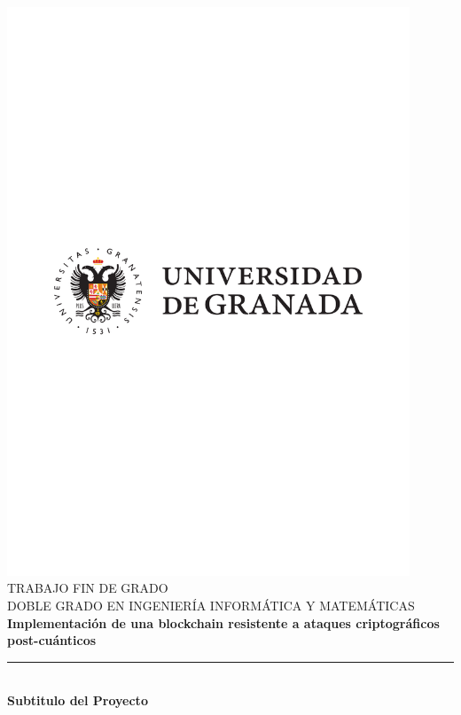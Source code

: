 \begin{titlepage}
 
 
\newlength{\centeroffset}
\setlength{\centeroffset}{-0.5\oddsidemargin}
\addtolength{\centeroffset}{0.5\evensidemargin}
\thispagestyle{empty}

\noindent\hspace*{\centeroffset}\begin{minipage}{\textwidth}

\centering
\includegraphics[width=0.9\textwidth]{portada/imagenes/logoModernoUGR.pdf}\\[1.4cm]

\textsc{ \Large TRABAJO FIN DE GRADO\\[0.2cm]}
\textsc{ DOBLE GRADO EN INGENIERÍA INFORMÁTICA Y MATEMÁTICAS }\\[1cm]
% 
{\Huge\bfseries Implementación de una blockchain resistente a ataques criptográficos post-cuánticos\\
}
\noindent\rule[-1ex]{\textwidth}{3pt}\\[3.5ex]
{\large\bfseries Subtitulo del Proyecto}
\end{minipage}


\end{titlepage}
